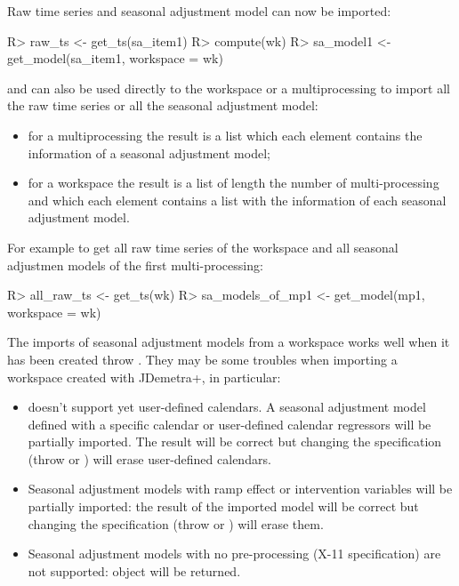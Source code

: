 \documentclass[article]{jss}
\providecommand{\tightlist}{%
  \setlength{\itemsep}{0pt}\setlength{\parskip}{0pt}}
\begin{document}
Raw time series and seasonal adjustment model can now be imported:

\begin{CodeChunk}

\begin{CodeInput}
R> raw_ts <- get_ts(sa_item1)
R> compute(wk)
R> sa_model1 <- get_model(sa_item1, workspace = wk)
\end{CodeInput}
\end{CodeChunk}

 and  can also be used directly to the
workspace or a multiprocessing to import all the raw time series or all
the seasonal adjustment model:

\begin{itemize}
\tightlist
\item
  for a multiprocessing the result is a list which each element contains
  the information of a seasonal adjustment model;\\
\item
  for a workspace the result is a list of length the number of
  multi-processing and which each element contains a list with the
  information of each seasonal adjustment model.
\end{itemize}

For example to get all raw time series of the workspace and all seasonal
adjustmen models of the first multi-processing:

\begin{CodeChunk}

\begin{CodeInput}
R> all_raw_ts <- get_ts(wk)
R> sa_models_of_mp1 <- get_model(mp1, workspace = wk)
\end{CodeInput}
\end{CodeChunk}

The imports of seasonal adjustment models from a workspace works well
when it has been created throw . They may be some
troubles when importing a workspace created with JDemetra+, in
particular:

\begin{itemize}
\tightlist
\item
   doesn't support yet user-defined calendars. A seasonal
  adjustment model defined with a specific calendar or user-defined
  calendar regressors will be partially imported. The result will be
  correct but changing the specification (throw  or
  ) will erase user-defined calendars.\\
\item
  Seasonal adjustment models with ramp effect or intervention variables
  will be partially imported: the result of the imported model will be
  correct but changing the specification (throw  or
  ) will erase them.\\
\item
  Seasonal adjustment models with no pre-processing (X-11 specification)
  are not supported:  object will be returned.
\end{itemize}
\end{document}
